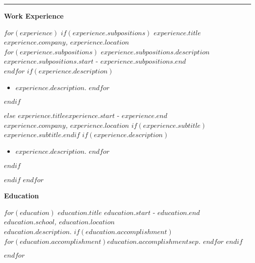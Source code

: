 \documentclass[]{$documentclass$}
\newcommand\Hline{\par\noindent\rule{\textwidth}{0.4pt}\par}
\newcommand\mytitle[1]{\vspace{5mm}\textbf{\Large #1}\par\vspace{5pt}}
\def\titleeducation{Utdanning}
\def\titleexperience{Arbeidserfaring}
\def\titleeducation{Education}
\def\titleexperience{Work Experience}
\begin{document}
{    \Hline
    
    \mytitle{\titleexperience}
    
    $for(experience)$
        $if(experience.subpositions)$
            \textbf{$experience.title$}\\
            \textit{$experience.company$, $experience.location$}\\
            $for(experience.subpositions)$
                $experience.subpositions.description$ \hfill $experience.subpositions.start$ - $experience.subpositions.end$\\
            $endfor$
            $if(experience.description)$
            \par\vspace{-\itemspacing}
            \begin{itemize}
            $for(experience.description)$
                \item $experience.description$.
            $endfor$
            \end{itemize}
            $endif$
            \par\vspace{\itemspacing}
        $else$
            \textbf{$experience.title$}\hfill $experience.start$ - $experience.end$\\
            \textit{$experience.company$, $experience.location$}
            $if(experience.subtitle)$\\$experience.subtitle$.$endif$
            $if(experience.description)$
            \begin{itemize}
            $for(experience.description)$
                \item $experience.description$.
            $endfor$
            \end{itemize}
            $endif$
            \par\vspace{\itemspacing}
        $endif$
    $endfor$
    \par\vspace{-\itemspacing}

    \mytitle{\titleeducation}
    $for(education)$
        \textbf{$education.title$} \hfill $education.start$ - $education.end$\\
        \textit{$education.school$, $education.location$}\\
        $education.description$.
        $if(education.accomplishment)$
        \textit{$for(education.accomplishment)$$education.accomplishment$$sep$. $endfor$}
        $endif$
        \par\vspace{\itemspacing}
    $endfor$
    \par\vspace{-\itemspacing}

}
\end{document}
